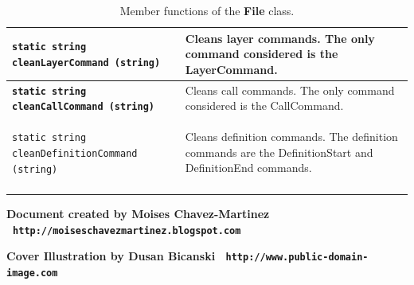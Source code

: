 \documentclass[11pt,twoside,openany,x11names,svgnames]{memoir}
\begin{document}
{\begin{longtable}{| >{\bfseries}p{9.8cm} | p{5.7cm} |}
	\hline
	
	\texttt{static string cleanLayerCommand (string)} & Cleans layer commands. The only command considered is the LayerCommand. \\
	
	\hline
	
	\texttt{static string cleanCallCommand (string)} & Cleans call commands. The only command considered is the CallCommand. \\
	
	\hline
	
	\texttt{static string cleanDefinitionCommand (string)} & Cleans definition commands. The definition commands are the DefinitionStart and DefinitionEnd commands. \\
			
	\hline
\caption{Member functions of the \textbf{File} class.}
\label{tab:File-MemberFunctions}
\end{longtable}
}

\cleartoverso


\enlargethispage{3\baselineskip}
\thispagestyle{empty}
\pagecolor[HTML]{0E0407}

\begin{center}
\begin{minipage}{.8\textwidth}
\color{Cornsilk}\Large\bfseries

\end{minipage}
\end{center}


\begin{center}

\vspace*{\baselineskip}

\textbf{\textcolor{LightGoldenrod!50!Gold}{Document created by Moises Chavez-Martinez \textbullet\ \texttt{http://moiseschavezmartinez.blogspot.com}}}

\vspace*{\baselineskip}

\textbf{\textcolor{LightGoldenrod}{Cover Illustration by Dusan Bicanski \textbullet\ \texttt{http://www.public-domain-image.com}}}
\end{center}
\end{document}
